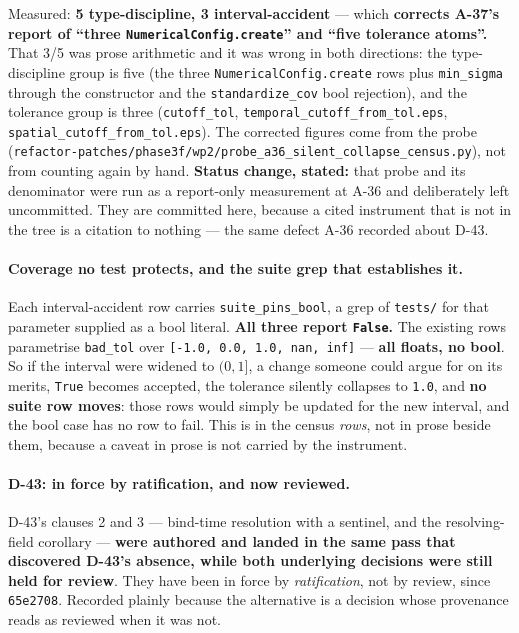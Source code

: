 \documentclass[
  10pt,
]{article}
\begin{document}
Measured: \textbf{5 type-discipline, 3 interval-accident} --- which \textbf{corrects A-37's report of ``three \texttt{NumericalConfig.create}'' and ``five tolerance atoms''.} That 3/5 was prose arithmetic and it was wrong in both directions: the type-discipline group is five (the three \texttt{NumericalConfig.create} rows plus \texttt{min\_sigma} through the constructor and the \texttt{standardize\_cov} bool rejection), and the tolerance group is three (\texttt{cutoff\_tol}, \texttt{temporal\_cutoff\_from\_tol.eps}, \texttt{spatial\_cutoff\_from\_tol.eps}). The corrected figures come from the probe (\texttt{refactor-patches/\allowbreak{}phase3f/wp2/\allowbreak{}probe\_a36\_silent\_collapse\_census.py}), not from counting again by hand. \textbf{Status change, stated:} that probe and its denominator were run as a report-only measurement at A-36 and deliberately left uncommitted. They are committed here, because a cited instrument that is not in the tree is a citation to nothing --- the same defect A-36 recorded about D-43.

\paragraph{Coverage no test protects, and the suite grep that establishes it.}
Each interval-accident row carries \texttt{suite\_pins\_bool}, a grep of \texttt{tests/} for that parameter supplied as a bool literal. \textbf{All three report \texttt{False}.} The existing rows parametrise \texttt{bad\_tol} over \texttt{[-1.0, 0.0, 1.0, nan, inf]} --- \textbf{all floats, no bool}. So if the interval were widened to \((0,1]\), a change someone could argue for on its merits, \texttt{True} becomes accepted, the tolerance silently collapses to \texttt{1.0}, and \textbf{no suite row moves}: those rows would simply be updated for the new interval, and the bool case has no row to fail. This is in the census \emph{rows}, not in prose beside them, because a caveat in prose is not carried by the instrument.

\paragraph{D-43: in force by ratification, and now reviewed.}
D-43's clauses 2 and 3 --- bind-time resolution with a sentinel, and the resolving-field corollary --- \textbf{were authored and landed in the same pass that discovered D-43's absence, while both underlying decisions were still held for review}. They have been in force by \emph{ratification}, not by review, since \texttt{65e2708}. Recorded plainly because the alternative is a decision whose provenance reads as reviewed when it was not.
\end{document}
